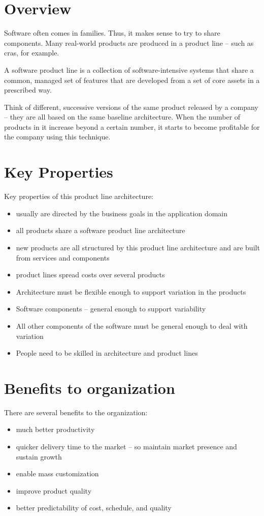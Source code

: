 \documentclass[a4paper]{report}
\begin{document}
\section{Overview}
Software often comes in families. Thus, it makes sense to try to share components. Many real-world products are produced in a product line – such as cras, for example.

A software product line is a collection of software-intensive systems that share a common, managed set of features that are developed from a set of core assets in a prescribed way. 

Think of different, successive versions of the same product released by a company – they are all based on the same baseline architecture. When the number of products in it increase beyond a certain number, it starts to become profitable for the company using this technique.

\section{Key Properties}
Key properties of this product line architecture:
\begin{itemize}
\item usually are directed by the business goals in the application domain
\item all products share a software product line architecture
\item new products are all structured by this product line architecture and are built from services and components
\item product lines spread costs over several products
\item Architecture must be flexible enough to support variation in the products
\item Software components – general enough to support variability
\item All other components of the software must be general enough to deal with variation
\item People need to be skilled in architecture and product lines
\end{itemize}

\section{Benefits to organization}
There are several benefits to the organization:
\begin{itemize}
\item much better productivity
\item quicker delivery time to the market – so maintain market presence and sustain growth
\item enable mass customization
\item improve product quality
\item better predictability of cost, schedule, and quality
\end{itemize}
\end{document}
